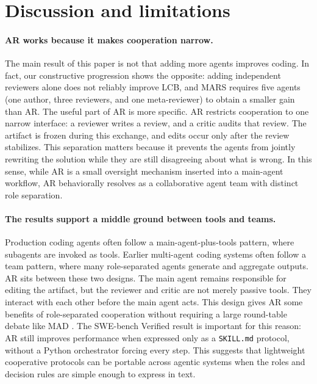 \documentclass{article}
\begin{document}
\section{Discussion and limitations}
\label{sec:limitations}

\paragraph{AR works because it makes cooperation narrow.}
The main result of this paper is not that adding more agents improves
coding. In fact, our constructive progression shows the opposite:
adding independent reviewers alone does not reliably improve LCB, and
MARS requires five agents (one author, three reviewers, and one meta-reviewer) to obtain a smaller gain than AR. The useful
part of AR is more specific. AR restricts cooperation to one narrow
interface: a reviewer writes a review, and a critic audits that review.
The artifact is frozen during this exchange, and edits occur only after the
review stabilizes. This separation matters because it prevents the
agents from jointly rewriting the solution while they are still
disagreeing about what is wrong. In this sense, while AR is a small oversight mechanism inserted into a main-agent workflow, AR behaviorally resolves as a collaborative agent team with distinct role separation.

\paragraph{The results support a middle ground between tools and teams.}
Production coding agents often follow a main-agent-plus-tools pattern,
where subagents are invoked as tools. Earlier multi-agent coding systems
often follow a team pattern, where many role-separated agents generate and aggregate outputs. AR sits between these two designs. The
main agent remains responsible for editing the artifact,
but the reviewer and critic are not merely passive tools. They interact
with each other before the main agent acts. This design gives AR some
benefits of role-separated cooperation without requiring a large
round-table debate like MAD \citep{du2023mad, smit2023mad, mars2025}. The SWE-bench Verified result is important for this
reason: AR still improves performance when expressed only as a
\texttt{SKILL.md} protocol, without a Python orchestrator forcing every
step. This suggests that lightweight cooperative protocols can be
portable across agentic systems when the roles and decision rules are
simple enough to express in text.
\end{document}
